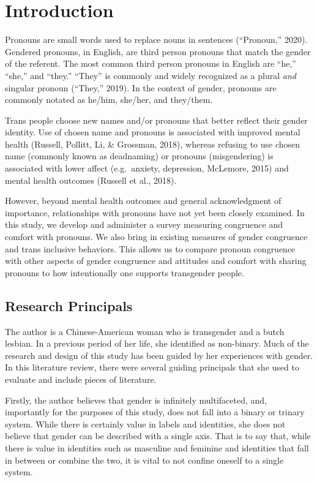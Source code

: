 \documentclass[12pt,twoside]{reedthesis}
\begin{document}
\hypertarget{introduction}{%
\chapter*{Introduction}\label{introduction}}

Pronouns are small words used to replace nouns in sentences (``Pronoun,'' 2020). Gendered pronouns, in English, are third person pronouns that match the gender of the referent. The most common third person pronouns in English are ``he,'' ``she,'' and ``they.'' ``They'' is commonly and widely recognized as a plural \emph{and} singular pronoun (``They,'' 2019). In the context of gender, pronouns are commonly notated as he/him, she/her, and they/them.

Trans people choose new names and/or pronouns that better reflect their gender identity. Use of chosen name and pronouns is associated with improved mental health (Russell, Pollitt, Li, \& Grossman, 2018), whereas refusing to use chosen name (commonly known as deadnaming) or pronouns (misgendering) is associated with lower affect (e.g.~anxiety, depression, McLemore, 2015) and mental health outcomes (Russell et al., 2018).

However, beyond mental health outcomes and general acknowledgment of importance, relationships with pronouns have not yet been closely examined. In this study, we develop and administer a survey measuring congruence and comfort with pronouns. We also bring in existing measures of gender congruence and trans inclusive behaviors. This allows us to compare pronoun congruence with other aspects of gender congruence and attitudes and comfort with sharing pronouns to how intentionally one supports transgender people.

\hypertarget{research-principals}{%
\section{Research Principals}\label{research-principals}}

The author is a Chinese-American woman who is transgender and a butch lesbian. In a previous period of her life, she identified as non-binary. Much of the research and design of this study has been guided by her experiences with gender. In this literature review, there were several guiding principals that she used to evaluate and include pieces of literature.

Firstly, the author believes that gender is infinitely multifaceted, and, importantly for the purposes of this study, does not fall into a binary or trinary system. While there is certainly value in labels and identities, she does not believe that gender can be described with a single axis. That is to say that, while there is value in identities such as masculine and feminine and identities that fall in between or combine the two, it is vital to not confine oneself to a single system.
\end{document}
